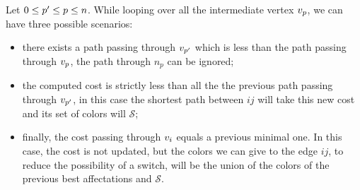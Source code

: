 Let $0 \leq p' \leq p \leq n$. While looping over all the intermediate vertex $v_p$, we can have three possible scenarios:
\begin{itemize}
  \item there exists a path passing through $v_{p'}$ which is less than the path passing through $v_p$, the path through $n_p$ can be ignored;
  \item the computed cost is strictly less than all the the previous path passing through $v_{p'}$, in this case the shortest path between $ij$ will take this new cost and its set of colors will $\mathcal{S}$;
  \item finally, the cost passing through $v_i$ equals a previous minimal one. In this case, the cost is not updated, but the colors we can give to the edge $ij$, to reduce the possibility of a switch, will be the union of the colors of the previous best affectations and $\mathcal{S}$.
\end{itemize}
